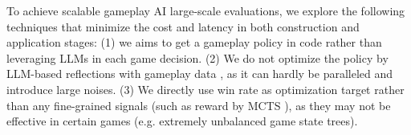 To achieve scalable gameplay AI large-scale evaluations, we explore the following techniques that minimize the cost and latency in both construction and application stages: (1) we aims to get a gameplay policy in code \cite{liang_code_2023,light2024strategist} rather than leveraging LLMs in each game decision. (2) We do not optimize the policy by LLM-based reflections with gameplay data \cite{shinn_reflexion_2023}, as it can hardly be paralleled and introduce large noises. (3) We directly use win rate as optimization target rather than any fine-grained signals (such as reward by MCTS \cite{light2024strategist}), as they may not be effective in certain games (e.g. extremely unbalanced game state trees).